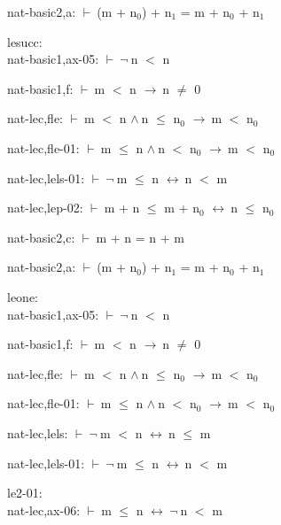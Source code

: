 \documentclass[a4paper]{article}
\newcommand{\Fol}{\mbox{$\vdash\ $}}
\newcommand{\Not}{\mbox{$\neg\ $}}
\newcommand{\And}{\mbox{$\wedge\ $}}
\newcommand{\Imp}{\mbox{$\rightarrow\ $}}
\newcommand{\Equiv}{\mbox{$\leftrightarrow\ $}}
\begin{document}
nat-basic2,a: 
 \Fol (m + $\mbox{n}_{0}$) + $\mbox{n}_{1}$ = m + $\mbox{n}_{0}$ + $\mbox{n}_{1}$



\bigskip

lesucc:\\ nat-basic1,ax-05: 
 \Fol \Not n $<$ n



nat-basic1,f: 
 \Fol m $<$ n \Imp n $\neq$ 0



nat-lec,fle: 
 \Fol m $<$ n \And n $\le$ $\mbox{n}_{0}$ \Imp m $<$ $\mbox{n}_{0}$



nat-lec,fle-01: 
 \Fol m $\le$ n \And n $<$ $\mbox{n}_{0}$ \Imp m $<$ $\mbox{n}_{0}$



nat-lec,lels-01: 
 \Fol \Not m $\le$ n \Equiv n $<$ m



nat-lec,lep-02: 
 \Fol m + n $\le$ m + $\mbox{n}_{0}$ \Equiv n $\le$ $\mbox{n}_{0}$



nat-basic2,c: 
 \Fol m + n = n + m



nat-basic2,a: 
 \Fol (m + $\mbox{n}_{0}$) + $\mbox{n}_{1}$ = m + $\mbox{n}_{0}$ + $\mbox{n}_{1}$



\bigskip

leone:\\ nat-basic1,ax-05: 
 \Fol \Not n $<$ n



nat-basic1,f: 
 \Fol m $<$ n \Imp n $\neq$ 0



nat-lec,fle: 
 \Fol m $<$ n \And n $\le$ $\mbox{n}_{0}$ \Imp m $<$ $\mbox{n}_{0}$



nat-lec,fle-01: 
 \Fol m $\le$ n \And n $<$ $\mbox{n}_{0}$ \Imp m $<$ $\mbox{n}_{0}$



nat-lec,lels: 
 \Fol \Not m $<$ n \Equiv n $\le$ m



nat-lec,lels-01: 
 \Fol \Not m $\le$ n \Equiv n $<$ m



\bigskip

le2-01:\\ nat-lec,ax-06: 
 \Fol m $\le$ n \Equiv \Not n $<$ m
\end{document}
